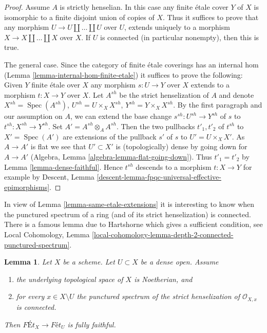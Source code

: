 \documentclass{stacks-project}
\theoremstyle{plain}
\newtheorem{lemma}[subsection]{Lemma}
\theoremstyle{definition}
\theoremstyle{remark}
\numberwithin{equation}{subsection}
\def\Spec{\mathop{\mathrm{Spec}}}
\begin{document}
\begin{proof}
Assume $A$ is strictly henselian. In this case any finite \'etale
cover $Y$ of $X$ is isomorphic to a finite disjoint union of
copies of $X$. Thus it suffices to prove that any morphism
$U \to U \amalg \ldots \amalg U$ over $U$, extends uniquely to a morphism
$X \to X \amalg \ldots \amalg X$ over $X$.
If $U$ is connected (in particular nonempty), then this is true.

\medskip\noindent
The general case. Since the category of finite \'etale coverings has an
internal hom (Lemma \ref{lemma-internal-hom-finite-etale})
it suffices to prove the following: Given $Y$ finite \'etale over $X$
any morphism $s : U \to Y$ over $X$ extends to a morphism $t : X \to Y$
over $X$. Let $A^{sh}$ be the strict henselization of $A$ and denote
$X^{sh} = \Spec(A^{sh})$, $U^{sh} = U \times_X X^{sh}$,
$Y^{sh} = Y \times_X X^{sh}$. By the first paragraph and our assumption
on $A$, we can extend the base change $s^{sh} : U^{sh} \to Y^{sh}$ of $s$ to
$t^{sh} : X^{sh} \to Y^{sh}$. Set $A' = A^{sh} \otimes_A A^{sh}$.
Then the two pullbacks $t'_1, t'_2$ of $t^{sh}$ to $X' = \Spec(A')$
are extensions of the pullback $s'$ of $s$ to $U' = U \times_X X'$.
As $A \to A'$ is flat we see that $U' \subset X'$ is (topologically) dense
by going down for $A \to A'$
(Algebra, Lemma \ref{algebra-lemma-flat-going-down}). Thus
$t'_1 = t'_2$ by Lemma \ref{lemma-dense-faithful}.
Hence $t^{sh}$ descends to a morphism $t : X \to Y$
for example by
Descent, Lemma \ref{descent-lemma-fpqc-universal-effective-epimorphisms}.
\end{proof}

\noindent
In view of Lemma \ref{lemma-same-etale-extensions}
it is interesting to know when the
punctured spectrum of a ring (and of its strict henselization)
is connected. There is a famous lemma due to Hartshorne
which gives a sufficient condition, see
Local Cohomology, Lemma
\ref{local-cohomology-lemma-depth-2-connected-punctured-spectrum}.

\begin{lemma}
\label{lemma-quasi-compact-dense-open-connected-at-infinity-Noetherian}
Let $X$ be a scheme. Let $U \subset X$ be a dense open. Assume
\begin{enumerate}
\item the underlying topological space of $X$ is Noetherian, and
\item for every $x \in X \setminus U$ the punctured spectrum of the
strict henselization of $\mathcal{O}_{X, x}$ is connected.
\end{enumerate}
Then $\textit{F\'Et}_X \to \textit{F\'et}_U$ is fully faithful.
\end{lemma}
\end{document}
